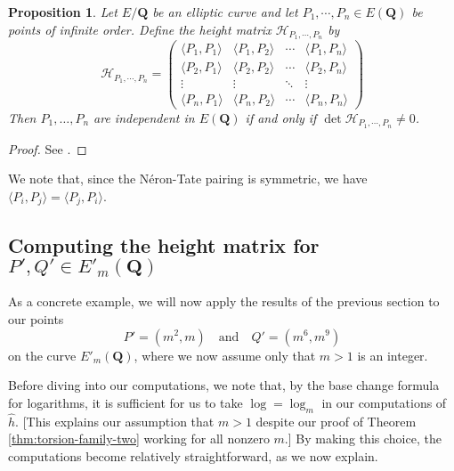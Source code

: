 \documentclass{amsart}
\newtheorem{proposition}[theorem]{Proposition}
\numberwithin{equation}{section}
\theoremstyle{remark}
\newcommand{\Q}{\mathbf{Q}}
\begin{document}
\begin{proposition}\label{prop:matrix}
Let $E/\Q$ be an elliptic curve and let $P_1,\cdots, P_n \in E(\Q)$ be points of infinite order. Define the height matrix $\mathcal{H}_{P_1,\cdots, P_n}$ by
\[
\mathcal{H}_{P_1,\cdots, P_n}=\left(
\begin{matrix}
\langle P_1, P_1 \rangle & \langle P_1, P_2 \rangle & \cdots & \langle P_1,P_n\rangle \\
\langle P_2, P_1 \rangle & \langle P_2, P_2 \rangle & \cdots & \langle P_2,P_n\rangle \\
\vdots & \vdots & \ddots & \vdots \\
\langle P_n, P_1 \rangle & \langle P_n, P_2 \rangle & \cdots & \langle P_n,P_n\rangle
\end{matrix}
\right)
\]
Then $P_1, \ldots, P_n$ are independent in $E(\Q)$ if and only if $\det \mathcal{H}_{P_1,\cdots, P_n}\neq0$.
\end{proposition}

\begin{proof} See \cite[Corollary 2.8.6]{alvaro-book}.
\end{proof}


We note that, since the N\'{e}ron-Tate pairing is symmetric, we have $\langle P_i, P_j \rangle = \langle P_j, P_i \rangle$.

\subsection{Computing the height matrix for $P',Q' \in E'_m(\Q)$}
As a concrete example, we will now apply the results of the previous section to our points
\[
P'=(m^2,m) \quad \text{and} \quad Q'=(m^6,m^9)
\]
on the curve $E'_m(\Q)$, where we now assume only that $m > 1$ is an integer.

Before diving into our computations, we note that, by the base change formula for logarithms, it is sufficient for us to take $\log = \log_m$ in our computations of $\hat{h}$. [This explains our assumption that $m>1$ despite our proof of Theorem \ref{thm:torsion-family-two} working for all nonzero $m$.] By making this choice, the computations become relatively straightforward, as we now explain.
\end{document}
